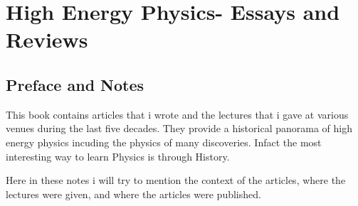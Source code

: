 \chapter{High Energy Physics- Essays and Reviews}\label{chap16}

\Authorline{}

\authinfo{}


             
\section{Preface and Notes}

This book contains articles that i wrote and the lectures
that i gave at various venues during the last five decades.
They provide a historical panorama of high energy physics incuding the 
physics of many discoveries. Infact the most interesting way to
learn Physics is through History.

Here in these notes i will try to mention the context of the
articles, where the lectures were given, and where the articles
were published.

